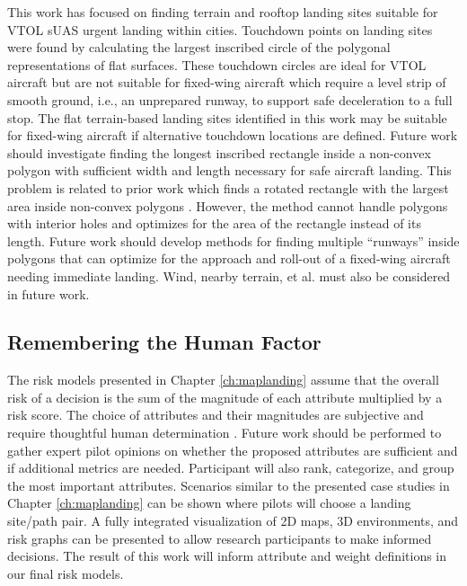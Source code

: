 This work has focused on finding terrain and rooftop landing sites suitable for \ac{VTOL} \ac{sUAS} urgent landing within cities. Touchdown points on landing sites were found by calculating the largest inscribed circle of the polygonal representations of flat surfaces. These touchdown circles are ideal for \ac{VTOL} aircraft but are not suitable for fixed-wing aircraft which require a level strip of smooth ground, i.e., an unprepared runway, to support safe deceleration to a full stop. The flat terrain-based landing sites identified in this work may be suitable for fixed-wing aircraft if alternative touchdown locations are defined. Future work should investigate finding the longest inscribed  rectangle inside a non-convex polygon with sufficient width and length necessary for safe aircraft landing. This problem is related to prior work which finds a rotated rectangle with the largest area inside non-convex polygons \cite{molano_finding_2012}. However, the method cannot handle polygons with interior holes and optimizes for the area of the rectangle instead of its length. Future work should develop methods for finding multiple ``runways'' inside polygons that can optimize for the approach and roll-out of a fixed-wing aircraft needing immediate landing. Wind, nearby terrain, et al. must also be considered in future work.

\subsection{Remembering the Human Factor}

The risk models presented in Chapter \ref{ch:maplanding} assume that the overall risk of a decision is the sum of the magnitude of each attribute multiplied by a risk score. The choice of attributes and their magnitudes are subjective and require thoughtful human determination \cite{Wickens2015}. Future work should be performed to gather expert pilot opinions on whether the proposed attributes are sufficient and if additional metrics are needed. Participant will also rank, categorize, and group the most important attributes. Scenarios similar to the presented case studies in Chapter \ref{ch:maplanding} can be shown where pilots will choose a landing site/path pair. A fully integrated visualization of 2D maps, 3D environments, and risk graphs can be presented to allow research participants to make informed decisions. The result of this work will inform attribute and weight definitions in our final risk models.

